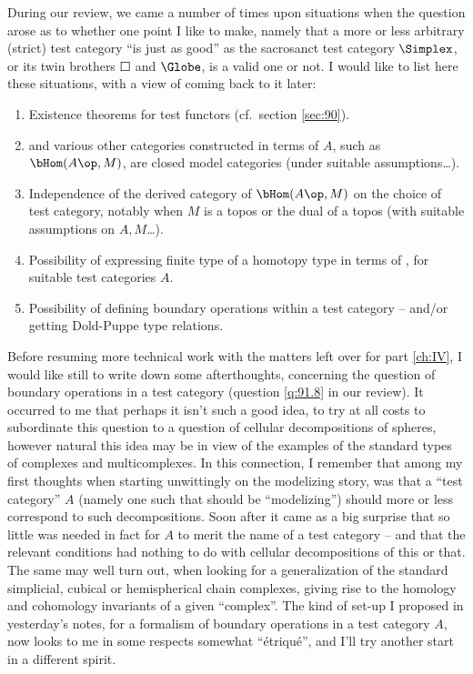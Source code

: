 During our review, we came a number of times upon situations when the
question arose as to whether one point I like to make, namely that a
more or less arbitrary (strict) test category ``is just as good'' as
the sacrosanct test category $\Simplex$, or its twin brothers
$\Square$ and $\Globe$, is a valid one or not. I would like to list
here these situations, with a view of coming back to it later:
\begin{enumerate}[label=\alph*)]
\item\label{it:92.a}
  Existence theorems for test functors (cf.\ section \ref{sec:90}).
\item\label{it:92.b}
  \Ahat{} and various other categories constructed in terms of $A$,
  such as $\bHom(A\op,M)$, are closed model categories (under suitable
  assumptions\ldots).
\item\label{it:92.c}
  Independence of the derived category of $\bHom(A\op,M)$ on the
  choice of test category, notably when $M$ is a topos or the dual of
  a topos (with suitable assumptions on $A,M$\ldots).
\item\label{it:92.d}
  Possibility of expressing finite type of a homotopy type in terms of
  \Ahatfp, for suitable test categories $A$.
\item\label{it:92.e}
  Possibility of defining boundary operations within a test category
  -- and/or getting Dold-Puppe type relations.
\end{enumerate}

\starsbreak

Before resuming more technical work with the matters left over for
part \ref{ch:IV}, I would like still to write down some afterthoughts,
concerning the question of boundary operations in a test category
(question \ref{q:91.8} in our review). It occurred to me that perhaps
it isn't such a good idea, to try at all costs to subordinate this
question to a question of cellular decompositions of spheres, however
natural this idea may be in view of the examples of the standard types
of complexes and multicomplexes. In this connection, I remember that
among my first thoughts when starting unwittingly on the modelizing
story, was that a ``test category'' $A$ (namely one such that \Ahat{}
should be ``modelizing'') should more or less correspond to such
decompositions. Soon after it came as a big surprise that so little
was needed in fact for $A$ to merit the name of a test category -- and
that the relevant conditions had nothing to do with cellular
decompositions of this or that. The same may well turn out, when
looking for a generalization of the standard simplicial, cubical or
hemispherical chain complexes, giving rise to the homology and
cohomology invariants of a given ``complex''. The kind of set-up I
proposed in yesterday's notes, for a formalism of boundary operations
in a test category $A$, now looks to me in some respects
somewhat ``étriqué'', and I'll try another start in a
different spirit.

